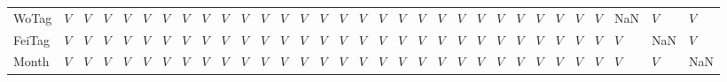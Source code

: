 \begin{tabular}{llllllllllllllllllllllllllllllll}
WoTag  &  $V$ &  $V$ &  $V$ &  $V$ &   $V$ &   $V$ &  $V$ &   $V$ &   $V$ &  $V$ &  $V$ &  $V$ &   $V$ &   $V$ &   $V$ &   $V$ &   $V$ &   $V$ &   $V$ &   $V$ &   $V$ &  $V$ &  $V$ &   $V$ &   $V$ &   $V$ &   $V$ &  $V$ &   NaN &    $V$ &   $V$ \\
FeiTag &  $V$ &  $V$ &  $V$ &  $V$ &   $V$ &   $V$ &  $V$ &   $V$ &   $V$ &  $V$ &  $V$ &  $V$ &   $V$ &   $V$ &   $V$ &   $V$ &   $V$ &   $V$ &   $V$ &   $V$ &   $V$ &  $V$ &  $V$ &   $V$ &   $V$ &   $V$ &   $V$ &  $V$ &   $V$ &    NaN &   $V$ \\
Month  &  $V$ &  $V$ &  $V$ &  $V$ &   $V$ &   $V$ &  $V$ &   $V$ &   $V$ &  $V$ &  $V$ &  $V$ &   $V$ &   $V$ &   $V$ &   $V$ &   $V$ &   $V$ &   $V$ &   $V$ &   $V$ &  $V$ &  $V$ &   $V$ &   $V$ &   $V$ &   $V$ &  $V$ &   $V$ &    $V$ &   NaN \\
\bottomrule
\end{tabular}

